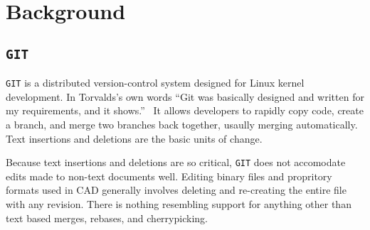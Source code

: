 \documentclass[sigconf]{acmart}
\begin{document}
\section{Background}

\subsection{\texttt{GIT}}

\texttt{GIT} is a distributed version-control system designed for Linux kernel development.
In Torvalds's own words ``Git was basically designed and written for my requirements, and it shows.''~\cite{https://www.linuxfoundation.org/blog/blog/10-years-of-git-an-interview-with-git-creator-linus-torvalds}
It allows developers to rapidly copy code, create a branch, and merge two branches back together, usaully merging automatically.
Text insertions and deletions are the basic units of change.


Because text insertions and deletions are so critical, \texttt{GIT} does not accomodate edits made to non-text documents well.
Editing binary files and propritory formats used in CAD generally involves deleting and re-creating the entire file with any revision.
There is nothing resembling support for anything other than text based merges, rebases, and cherrypicking.



\end{document}

